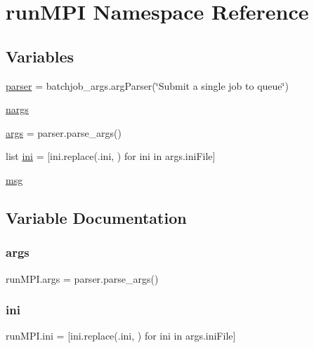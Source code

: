 \hypertarget{namespacerunMPI}{}\section{run\+M\+PI Namespace Reference}
\label{namespacerunMPI}
\subsection*{Variables}
\begin{DoxyCompactItemize}
\item 
\mbox{\hyperlink{namespacerunMPI_a7d5ec96e5fc04c2aca0ea81aa196beec}{parser}} = batchjob\+\_\+args.\+arg\+Parser(\char`\"{}Submit a single job to queue\char`\"{})
\item 
\mbox{\hyperlink{namespacerunMPI_a25d1267c13dc9a8ae7c5859d66c04cbc}{nargs}}
\item 
\mbox{\hyperlink{namespacerunMPI_a0c1f34d98cfa024c51c3592336e2360d}{args}} = parser.\+parse\+\_\+args()
\item 
list \mbox{\hyperlink{namespacerunMPI_a27eec3467fff7f69d98d3fc556f41320}{ini}} = \mbox{[}ini.\+replace(\textquotesingle{}.ini\textquotesingle{}, \textquotesingle{}\textquotesingle{}) for ini in args.\+ini\+File\mbox{]}
\item 
\mbox{\hyperlink{namespacerunMPI_a6468bed560f1b1cc6272ac40f064517d}{msg}}
\end{DoxyCompactItemize}


\subsection{Variable Documentation}
\mbox{\label{namespacerunMPI_a0c1f34d98cfa024c51c3592336e2360d}} 
\subsubsection{\texorpdfstring{args}{args}}
{\footnotesize\ttfamily run\+M\+P\+I.\+args = parser.\+parse\+\_\+args()}

\mbox{\label{namespacerunMPI_a27eec3467fff7f69d98d3fc556f41320}} 
\subsubsection{\texorpdfstring{ini}{ini}}
{\footnotesize\ttfamily run\+M\+P\+I.\+ini = \mbox{[}ini.\+replace(\textquotesingle{}.ini\textquotesingle{}, \textquotesingle{}\textquotesingle{}) for ini in args.\+ini\+File\mbox{]}}

